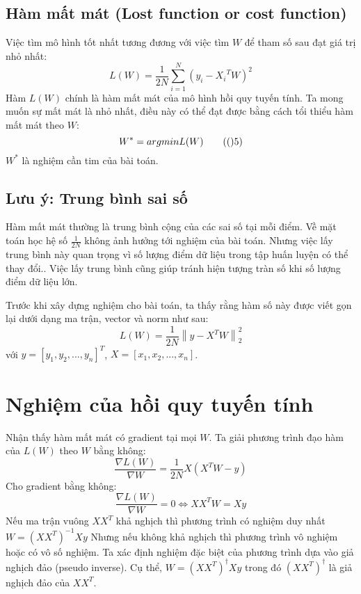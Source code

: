 \documentclass{article}
\begin{document}
\subsection{Hàm mất mát (Lost function or cost function)}
Việc tìm mô hình tốt nhất tương đương với việc tìm $W$ để tham số sau đạt giá trị nhỏ nhất:
\begin{equation}
    L(W) = \frac{1}{2N} \sum_{i = 1}^N(y_i-{X_i}^TW)^2 \tag{4}
\end{equation}
Hàm $L(W)$ chính là hàm mất mát của mô hình hồi quy tuyến tính. Ta mong muốn sự mất mát là nhỏ nhất, điều này có thể đạt được bằng cách tổi thiểu hàm mất mát theo $W$:
\begin{equation}
    W^* = argminL(W) \tag(5)
\end{equation}
$W^*$ là nghiệm cần tim của bài toán.

\subsection{Lưu ý: Trung bình sai số}

Hàm mất mát thường là trung bình cộng của các sai số tại mỗi điểm. Về mặt toán học hệ số $\frac{1}{2N}$ không ảnh hưởng tới nghiệm của bài toán. Nhưng việc lấy trung bình này quan trọng vì số lượng điểm dữ liệu trong tập huấn luyện có thể thay đổi.. Việc lấy trung bình cũng giúp tránh hiện tượng tràn số khi số lượng điểm dữ liệu lớn. 

Trước khi xây dựng nghiệm cho bài toán, ta thấy rằng hàm số này được viết gọn lại dưới dạng ma trận, vector và norm như sau:
\begin{equation}
    L(W) = \frac{1}{2N} \left\| y - X^TW \right\|_2^2 \tag{6}
\end{equation}
với $y = [y_1, y_2,..., y_n]^T$, $X=[x_1, x_2,..., x_n]$.
\section{Nghiệm của hồi quy tuyến tính}

Nhận thấy hàm mất mát có gradient tại mọi $W$. Ta giải phương trình đạo hàm của $L(W)$ theo $W$ bằng không:
\begin{equation}
    \frac{\nabla L(W)}{\nabla W} = \frac{1}{2N}X(X^TW - y) \tag{7}
\end{equation}
Cho gradient bằng không:
\begin{equation}
    \frac{\nabla L(W)}{\nabla W} = 0 \Leftrightarrow   XX^TW = Xy \tag{8}
\end{equation}
Nếu ma trận vuông $XX^T$ khả nghịch thì phương trình có nghiệm duy nhất $W = (XX^T)^{-1}Xy$ 
Nhưng nếu không khả nghịch thì phương trình vô nghiệm hoặc có vô số nghiệm. Ta xác định nghiệm đặc biệt của phương trình dựa vào giả nghịch đảo (pseudo inverse). Cụ thể, $W = (XX^T)^{\dagger}Xy$ trong đó $(XX^T)^{\dagger}$ là giả nghịch đảo của $XX^T$. 
\end{document}
